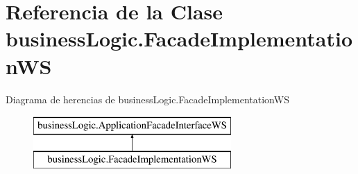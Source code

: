 \hypertarget{classbusiness_logic_1_1_facade_implementation_w_s}{}\section{Referencia de la Clase business\+Logic.\+Facade\+Implementation\+WS}
\label{classbusiness_logic_1_1_facade_implementation_w_s}
Diagrama de herencias de business\+Logic.\+Facade\+Implementation\+WS\begin{figure}[H]
\begin{center}
\leavevmode
\includegraphics[height=2.000000cm]{classbusiness_logic_1_1_facade_implementation_w_s}
\end{center}
\end{figure}
